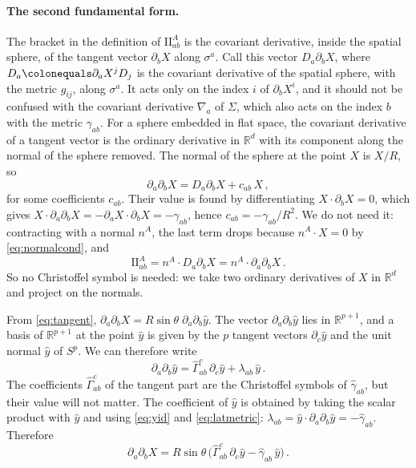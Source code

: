 \documentclass[a4paper,11pt]{article}
\newcommand{\II}{\mathrm{I\!I}}
\begin{document}
\paragraph{The second fundamental form.}
The bracket in the definition of $\II^A_{ab}$ is the covariant derivative, inside the spatial sphere, of the tangent vector $\partial_bX$ along $\sigma^a$. Call this vector $D_a\partial_bX$, where $D_a\colonequals\partial_aX^j D_j$ is the covariant derivative of the spatial sphere, with the metric $g_{ij}$, along $\sigma^a$. It acts only on the index $i$ of $\partial_bX^i$, and it should not be confused with the covariant derivative $\nabla_a$ of $\Sigma$, which also acts on the index $b$ with the metric $\gamma_{ab}$. For a sphere embedded in flat space, the covariant derivative of a tangent vector is the ordinary derivative in $\mathbb{R}^d$ with its component along the normal of the sphere removed. The normal of the sphere at the point $X$ is $X/R$, so
\begin{equation}
	\partial_a\partial_bX=D_a\partial_bX+c_{ab}\,X\, ,
\end{equation}
for some coefficients $c_{ab}$. Their value is found by differentiating $X\cdot\partial_bX=0$, which gives $X\cdot\partial_a\partial_bX=-\partial_aX\cdot\partial_bX=-\gamma_{ab}$, hence $c_{ab}=-\gamma_{ab}/R^2$. We do not need it: contracting with a normal $n^A$, the last term drops because $n^A\cdot X=0$ by \eqref{eq:normalcond}, and
\begin{equation}\label{eq:IIflat}
	\II^A_{ab}=n^A\cdot D_a\partial_bX=n^A\cdot\partial_a\partial_bX\, .
\end{equation}
So no Christoffel symbol is needed: we take two ordinary derivatives of $X$ in $\mathbb{R}^d$ and project on the normals.


From \eqref{eq:tangent}, $\partial_a\partial_bX=R\sin\theta\;\partial_a\partial_b\hat y$. The vector $\partial_a\partial_b\hat y$ lies in $\mathbb{R}^{p+1}$, and a basis of $\mathbb{R}^{p+1}$ at the point $\hat y$ is given by the $p$ tangent vectors $\partial_c\hat y$ and the unit normal $\hat y$ of $S^p$. We can therefore write
\begin{equation}
	\partial_a\partial_b\hat y=\hat\Gamma^c_{ab}\,\partial_c\hat y+\lambda_{ab}\,\hat y\, .
\end{equation}
The coefficients $\hat\Gamma^c_{ab}$ of the tangent part are the Christoffel symbols of $\hat\gamma_{ab}$, but their value will not matter. The coefficient of $\hat y$ is obtained by taking the scalar product with $\hat y$ and using \eqref{eq:yid} and \eqref{eq:latmetric}: $\lambda_{ab}=\hat y\cdot\partial_a\partial_b\hat y=-\hat\gamma_{ab}$. Therefore
\begin{equation}\label{eq:ddX}
	\partial_a\partial_bX=R\sin\theta\,\bigl(\hat\Gamma^c_{ab}\,\partial_c\hat y-\hat\gamma_{ab}\,\hat y\bigr)\, .
\end{equation}
\end{document}
